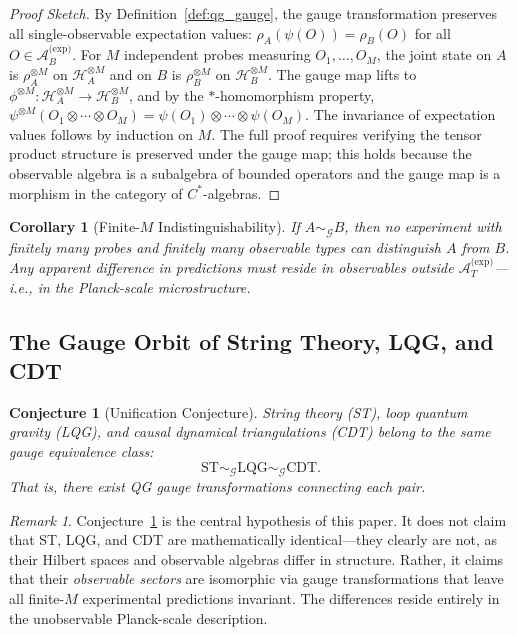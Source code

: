 \documentclass[12pt,a4paper]{article}
\newtheorem{corollary}[theorem]{Corollary}
\newtheorem{conjecture}[theorem]{Conjecture}
\theoremstyle{remark}
\newtheorem{remark}[theorem]{Remark}
\newcommand{\G}{\mathcal{G}}
\newcommand{\A}{\mathcal{A}}
\newcommand{\Hilb}{\mathcal{H}}
\begin{document}
\begin{proof}[Proof Sketch]
By Definition~\ref{def:qg_gauge}, the gauge transformation preserves all single-observable expectation values: $\rho_A(\psi(O)) = \rho_B(O)$ for all $O \in \A_B^{\text{(exp)}}$. For $M$ independent probes measuring $O_1, \ldots, O_M$, the joint state on $A$ is $\rho_A^{\otimes M}$ on $\Hilb_A^{\otimes M}$ and on $B$ is $\rho_B^{\otimes M}$ on $\Hilb_B^{\otimes M}$. The gauge map lifts to $\phi^{\otimes M}: \Hilb_A^{\otimes M} \to \Hilb_B^{\otimes M}$, and by the $*$-homomorphism property, $\psi^{\otimes M}(O_1 \otimes \cdots \otimes O_M) = \psi(O_1) \otimes \cdots \otimes \psi(O_M)$. The invariance of expectation values follows by induction on $M$. The full proof requires verifying the tensor product structure is preserved under the gauge map; this holds because the observable algebra is a subalgebra of bounded operators and the gauge map is a morphism in the category of $C^*$-algebras.
\end{proof}

\begin{corollary}[Finite-$M$ Indistinguishability]
\label{cor:finite_indist}
If $A \sim_{\G} B$, then no experiment with finitely many probes and finitely many observable types can distinguish $A$ from $B$. Any apparent difference in predictions must reside in observables outside $\A_T^{\text{(exp)}}$---i.e., in the Planck-scale microstructure.
\end{corollary}

\subsection{The Gauge Orbit of String Theory, LQG, and CDT}

\begin{conjecture}[Unification Conjecture]
\label{conj:unification}
String theory (ST), loop quantum gravity (LQG), and causal dynamical triangulations (CDT) belong to the same gauge equivalence class:
\begin{equation}
  \text{ST} \sim_{\G} \text{LQG} \sim_{\G} \text{CDT}.
\end{equation}
That is, there exist QG gauge transformations connecting each pair.
\end{conjecture}

\begin{remark}
\label{rem:unification}
Conjecture~\ref{conj:unification} is the central hypothesis of this paper. It does not claim that ST, LQG, and CDT are mathematically identical---they clearly are not, as their Hilbert spaces and observable algebras differ in structure. Rather, it claims that their \emph{observable sectors} are isomorphic via gauge transformations that leave all finite-$M$ experimental predictions invariant. The differences reside entirely in the unobservable Planck-scale description.
\end{remark}
\end{document}

